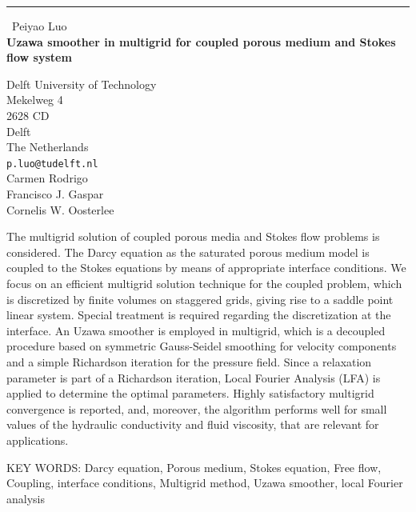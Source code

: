 \documentclass{report}
\begin{document}
\begin{center}
\rule{6in}{1pt} \
{\large Peiyao Luo \\
{\bf Uzawa smoother in multigrid for coupled porous medium and Stokes flow system}}

Delft University of Technology \\ Mekelweg 4 \\ 2628 CD \\ Delft \\ The Netherlands
\\
{\tt p.luo@tudelft.nl}\\
Carmen Rodrigo\\
Francisco J. Gaspar\\
Cornelis W.  Oosterlee\end{center}

The multigrid solution of coupled porous media and Stokes flow problems
is considered. The Darcy equation as the saturated porous medium model is
coupled to the Stokes equations
by means of appropriate interface conditions. We focus on an efficient
multigrid solution technique for the coupled problem, which is
discretized by finite volumes on staggered grids, giving rise to a saddle
point linear system. Special treatment is required regarding the
discretization at the interface.
An Uzawa smoother is employed in multigrid, which is a decoupled
procedure based on symmetric Gauss-Seidel smoothing for velocity
components and a simple Richardson iteration for the pressure field.
Since a relaxation parameter is part of a Richardson iteration, Local
Fourier Analysis (LFA) is applied to determine the optimal parameters.
Highly satisfactory multigrid convergence is reported, and, moreover, the
algorithm performs well for small values of the hydraulic conductivity
and fluid viscosity, that are relevant for applications.

KEY WORDS: Darcy equation, Porous medium, Stokes equation, Free flow,
Coupling, interface conditions, Multigrid method, Uzawa smoother, local
Fourier analysis
\end{document}
